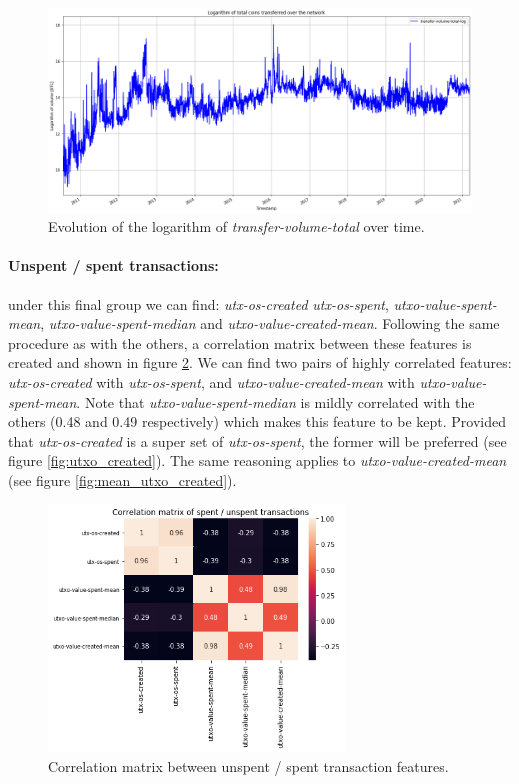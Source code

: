 \begin{figure}[H]
    \centering
    \includegraphics[width=\textwidth]{methods/images/transfer_volume_total.png}
    \caption{Evolution of the logarithm of \emph{transfer-volume-total} over time.}
    \label{fig:transfer-volume-total}
\end{figure}

\paragraph{Unspent / spent transactions:} under this final group we can find:
\emph{utx-os-created} \emph{utx-os-spent}, \emph{utxo-value-spent-mean},
\emph{utxo-value-spent-median} and \emph{utxo-value-created-mean}. Following the
same procedure as with the others, a correlation matrix between these features
is created and shown in figure \ref{fig:utxo_corr}. We can find two pairs of
highly correlated features: \emph{utx-os-created} with \emph{utx-os-spent}, and
\emph{utxo-value-created-mean} with \emph{utxo-value-spent-mean}. Note that
\emph{utxo-value-spent-median} is mildly correlated with the others (0.48 and
0.49 respectively) which makes this feature to be kept. Provided that
\emph{utx-os-created} is a super set of \emph{utx-os-spent}, the former will be
preferred (see figure \ref{fig:utxo_created}). The same reasoning applies to
 \emph{utxo-value-created-mean} (see figure \ref{fig:mean_utxo_created}).



\begin{figure}[H]
    \centering
    \includegraphics[width=0.7\textwidth]{methods/images/utxo_corr.png}
    \caption{Correlation matrix between unspent / spent transaction features.}
    \label{fig:utxo_corr}
\end{figure}


